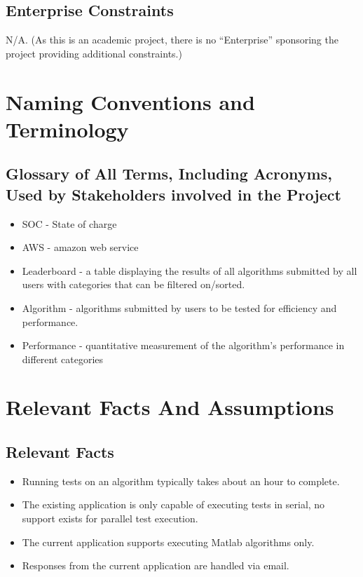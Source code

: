 \documentclass[12pt]{article}
\begin{document}
\subsection{Enterprise Constraints}
N/A. (As this is an academic project, there is no “Enterprise” sponsoring the project providing additional constraints.)

\section{Naming Conventions and Terminology}
\subsection{Glossary of All Terms, Including Acronyms, Used by Stakeholders
involved in the Project}
\begin{itemize}
\item SOC - State of charge
\item AWS - amazon web service
\item Leaderboard - a table displaying the results of all algorithms submitted by all users with categories that can be filtered on/sorted. 
\item Algorithm - algorithms submitted by users to be tested for efficiency and performance.
\item Performance - quantitative measurement of the algorithm’s performance in different categories

\end{itemize}



\section{Relevant Facts And Assumptions}
\subsection{Relevant Facts}
\begin{itemize}
\item Running tests on an algorithm typically takes about an hour to complete.
\item The existing application is only capable of executing tests in serial, no support exists for parallel test execution.
\item The current application supports executing Matlab algorithms only.
\item Responses from the current application are handled via email.
\end{itemize}
\end{document}
